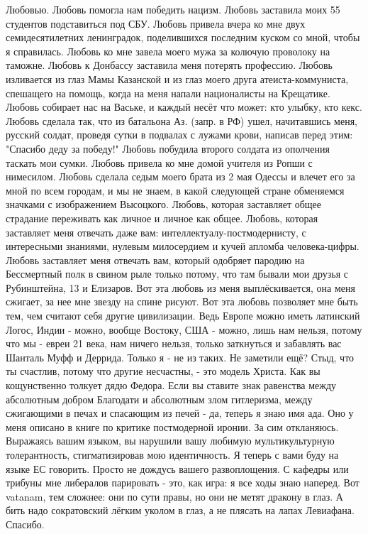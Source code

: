 \begin{itemize}
Любовью. Любовь помогла нам победить нацизм. Любовь заставила моих 55 студентов
подставиться под СБУ. Любовь привела вчера ко мне двух семидесятилетних
ленинградок, поделившихся последним куском со мной, чтобы я справилась. Любовь
ко мне завела моего мужа за колючую проволоку на таможне. Любовь к Донбассу
заставила меня потерять профессию. Любовь изливается из глаз Мамы Казанской и
из глаз моего друга атеиста-коммуниста, спешащего на помощь, когда на меня
напали националисты на Крещатике. Любовь собирает нас на Ваське, и каждый несёт
что может: кто улыбку, кто кекс. Любовь сделала так, что из батальона Аз.
(запр. в РФ) ушел, начитавшись меня, русский солдат, проведя сутки в подвалах с
лужами крови, написав перед этим: "Спасибо деду за победу!" Любовь побудила
второго солдата из ополчения таскать мои сумки. Любовь привела ко мне домой
учителя из Ропши с нимесилом. Любовь сделала седым моего брата из 2 мая Одессы
и влечет его за мной по всем городам, и мы не знаем, в какой следующей стране
обменяемся значками с изображением Высоцкого. Любовь, которая заставляет общее
страдание переживать как личное и личное как общее. Любовь, которая заставляет
меня отвечать даже вам: интеллектуалу-постмодернисту, с интересными знаниями,
нулевым милосердием и кучей апломба человека-цифры. Любовь заставляет меня
отвечать вам, который одобряет пародию на Бессмертный полк в свином рыле только
потому, что там бывали мои друзья с Рубинштейна, 13 и Елизаров. Вот эта любовь
из меня выплёскивается, она меня сжигает, за нее мне звезду на спине рисуют.
Вот эта любовь позволяет мне быть тем, чем считают себя другие цивилизации.
Ведь Европе можно иметь латинский Логос, Индии - можно, вообще Востоку, США -
можно, лишь нам нельзя, потому что мы - евреи 21 века, нам ничего нельзя,
только заткнуться и забавлять вас Шанталь Муфф и Деррида. Только я - не из
таких. Не заметили ещё? Стыд, что ты счастлив, потому что другие несчастны, -
это модель Христа. Как вы кощунственно толкует дядю Федора. Если вы ставите
знак равенства между абсолютным добром Благодати и абсолютным злом гитлеризма,
между сжигающими в печах и спасающим из печей - да, теперь я знаю имя ада. Оно
у меня описано в книге по критике постмодерной иронии. За сим откланяюсь.
Выражаясь вашим языком, вы нарушили вашу любимую мультикультурную
толерантность, стигматизировав мою идентичность. Я теперь с вами буду на языке
ЕС говорить. Просто не дождусь вашего развоплощения. С кафедры или трибуны мне
либералов парировать - это, как игра: я все ходы знаю наперед. Вот vatanam, тем
сложнее: они по сути правы, но они не метят дракону в глаз. А бить надо
сократовский лёгким уколом в глаз, а не плясать на лапах Левиафана. Спасибо.


\end{itemize}
